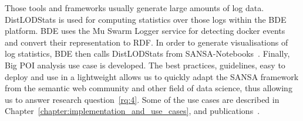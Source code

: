 \begin{enumerate}
    Those tools and frameworks usually generate large amounts of log data. 
    DistLODStats is used for computing statistics over those logs within the BDE platform. 
    BDE uses the Mu Swarm Logger service for detecting docker events and convert their representation to RDF. 
    In order to generate visualisations of log statistics, BDE then calls DistLODStats from SANSA-Notebooks~\cite{iermilov-2017-sansa-iswc-demo}.
    Finally, Big \gls{POI} analysis use case is developed.
    The best practices, guidelines, easy to deploy and use in a lightweight allows us to quickly adapt the SANSA framework from the semantic web community and other field of data science, thus allowing us to answer research question~\ref{rq:4}.
    Some of the use cases are described in Chapter~\ref{chapter:implementation_and_use_cases}, and publications~\cite{lehmann-2017-sansa-iswc, iermilov-2017-sansa-iswc-demo, sansa-hubs-and-authorities-transaction-semantics19-poster, piping-clustering-eswc19-poster, graux-2018-sansa-ethereum-semantics-poster, Auer+ICWE-2017}.

\end{enumerate}


